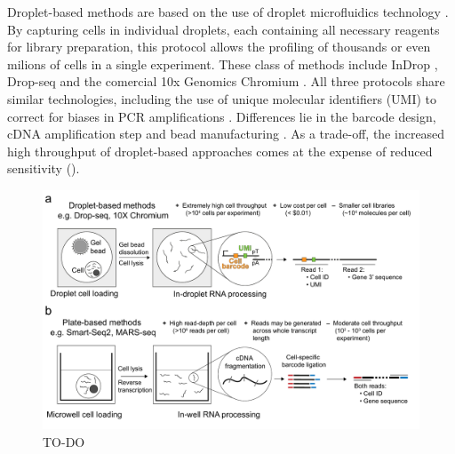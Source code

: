 Droplet-based methods are based on the use of droplet microfluidics technology \cite{Zhang2019}. By capturing cells in individual droplets, each containing all necessary reagents for library preparation, this protocol allows the profiling of thousands or even milions of cells in a single experiment. These class of methods include InDrop \cite{Klein2015,Zilionis2016}, Drop-seq\cite{Macosko2015} and the comercial 10x Genomics Chromium \cite{Zheng2017}. All three protocols share similar technologies, including the use of unique molecular identifiers (UMI) to correct for biases in PCR amplifications \cite{Kivioja2011}. Differences lie in the barcode design, cDNA amplification step and bead manufacturing \cite{Zhang2019}. As a trade-off, the increased high throughput of droplet-based approaches comes at the expense of reduced sensitivity\cite{Ziegenhain2017,Wang2019,Svensson2017} ().

\begin{figure}[H]
	\centering
	\includegraphics[width=0.85\linewidth]{scRNA_methods}
	\caption[]{TO-DO}
	\label{fig:scrna_methods}
\end{figure}

